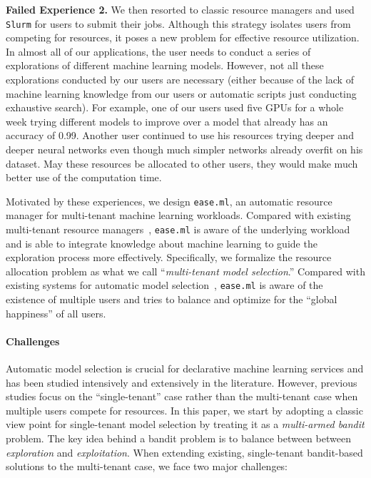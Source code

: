 \documentclass[letterpaper]{vldb}
\newcommand{\eml}{\texttt{ease.ml}\xspace}
\begin{document}
\vspace{0.5em}
\noindent
{\bf Failed Experience 2.} We then resorted to classic resource
managers and used \texttt{Slurm} for users to submit 
their jobs. 
Although this strategy isolates
users from competing for resources, it poses a
new problem for effective resource utilization.
In almost all of our applications, the user needs to conduct 
a series of explorations of different machine learning
models.
However, not all these explorations conducted by
our users are necessary (either because of the lack
of machine learning knowledge from our users or automatic 
scripts just conducting exhaustive search). For example,
one of our users used five GPUs for a whole week
trying different models to improve
over a model that already has an accuracy of 0.99.
Another user 
continued to use his resources trying deeper and 
deeper neural networks even though much simpler
networks already overfit on his dataset.
May these resources be allocated to other users,
they would make much better use of the computation time.

\vspace{0.5em}
Motivated by these experiences, we design
\eml, an automatic resource manager for multi-tenant machine learning workloads.
Compared with existing multi-tenant 
resource managers~\cite{XXX,XXX,XXX,XXX,XXX,XXX,XXX,XXX}, \eml
is aware of the underlying workload and is able to
integrate knowledge about machine learning
to guide the exploration process more effectively.
Specifically, we formalize the resource allocation problem as what we call ``{\em multi-tenant model selection}.''
Compared with existing systems for automatic
model selection~\cite{XXX,XXX,XXX,XXX,XXX,XXX,XXX,XXX}, \eml is aware of the existence of
multiple users and tries to balance and optimize for
the ``global happiness'' of all users.


\paragraph*{Challenges}

Automatic model selection is crucial for declarative machine learning services and has been studied intensively and extensively in the literature.
However, previous studies focus on the ``single-tenant'' case rather than the multi-tenant case when multiple users compete
for resources.
In this paper, we start by adopting a classic 
view point for single-tenant model selection by treating 
it as a \emph{multi-armed bandit} problem. 
The key idea behind a bandit problem is
to balance between between \emph{exploration} and \emph{exploitation}. When extending existing, single-tenant 
bandit-based solutions to the multi-tenant case, 
we face two major challenges:
\end{document}
